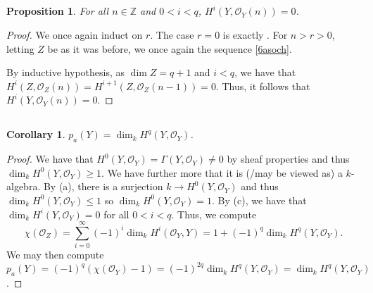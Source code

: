 \documentclass[english,letter,doublesided]{article}
\newcommand{\ZZ}{\mathbb{Z}}
\newcommand{\OO}{\mathcal{O}}
\newcommand{\prt}[1]{\setcounter{subsection}{#1-1}\subsection{}}
\newtheorem*{prop*}{Proposition}
\newtheorem*{cor*}{Corollary}
\theoremstyle{remark}
\theoremstyle{definition}
\begin{document}
\prt{3}\begin{prop*}
	For all $n\in \ZZ$ and $0<i<q$, $H^i(Y,\OO_Y(n))=0$. 
\end{prop*}\begin{proof}
We once again induct on $r$. The case $r=0$ is exactly \cite[III.5.1(b)]{HSAG}. For $n>r>0$, letting $Z$ be as it was before, we once again the sequence \eqref{6asoch}.
By inductive hypothesis, as $\dim Z=q+1$ and $i<q$, we have that $H^i(Z,\OO_Z(n))=H^{i+1}(Z,\OO_Z(n-1))=0$. Thus, it follows that $H^i(Y,\OO_Y(n))=0$.
\end{proof}
\prt{4}
\begin{cor*}
	$p_a(Y)=\dim_kH^q(Y,\OO_Y)$.
\end{cor*}
\begin{proof}
	We have that $H^0(Y,\OO_Y)=\Gamma(Y,\OO_Y)\neq 0$ by sheaf properties and thus $\dim_kH^0(Y,\OO_Y)\geq 1$. We have further more that it is (/may be viewed as) a $k$-algebra. By (a), there is a surjection $k\to H^0(Y,\OO_Y)$ and thus $\dim_kH^0(Y,\OO_Y)\leq 1$ so $\dim_kH^0(Y,\OO_Y)=1$. By (c), we have that $\dim_kH^i(Y,\OO_Y)=0$ for all $0<i<q$. Thus, we compute \[\chi(\OO_Z)=\sum_{i=0}^\infty(-1)^i\dim_kH^i(\OO_Y,Y)=1+(-1)^q\dim_kH^q(Y,\OO_Y).\]
	We may then compute $p_a(Y)=(-1)^q(\chi(\OO_Y)-1)=(-1)^{2q}\dim_kH^q(Y,\OO_Y)=\dim_kH^q(Y,\OO_Y)$.
\end{proof}
\label{sec6c}
\printbibliography
\end{document}
